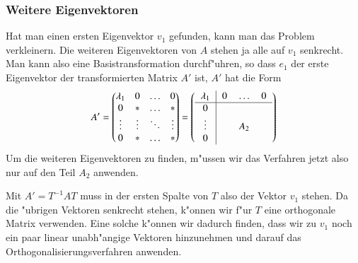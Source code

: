 \subsubsection{Weitere Eigenvektoren}
Hat man einen ersten Eigenvektor $v_1$ gefunden,
kann man das Problem verkleinern.
Die weiteren Eigenvektoren von $A$ stehen ja alle auf  $v_1$
senkrecht.
Man kann also eine Basistransformation
durchf"uhren, so dass $e_1$ der erste Eigenvektor der transformierten
Matrix $A'$ ist, $A'$ hat die Form
\[
A'=\begin{pmatrix}
\lambda_1&0&\dots&0\\
0&*&\dots&*\\
\vdots&\vdots&\ddots&\vdots\\
0&*&\dots&*
\end{pmatrix}
=
\left(
\begin{tabular}{>{$}c<{$}|>{$}c<{$}>{$}c<{$}>{$}c<{$}}
\lambda_1&0&\dots&0\\
\hline
0&&&\\
\vdots&&A_2&\\
0&&&
\end{tabular}
\right)
\]
Um die weiteren Eigenvektoren zu finden, m"ussen wir das Verfahren jetzt
also nur auf den Teil $A_2$ anwenden.

Mit $A'=T^{-1}AT$ muss in der ersten Spalte von $T$
also der Vektor $v_1$ stehen.
Da die "ubrigen Vektoren senkrecht stehen,
k"onnen wir f"ur $T$ eine orthogonale Matrix verwenden.
Eine solche
k"onnen wir dadurch finden, dass wir zu $v_1$ noch ein paar linear
unabh"angige Vektoren hinzunehmen und darauf das Orthogonalisierungsverfahren
anwenden.

